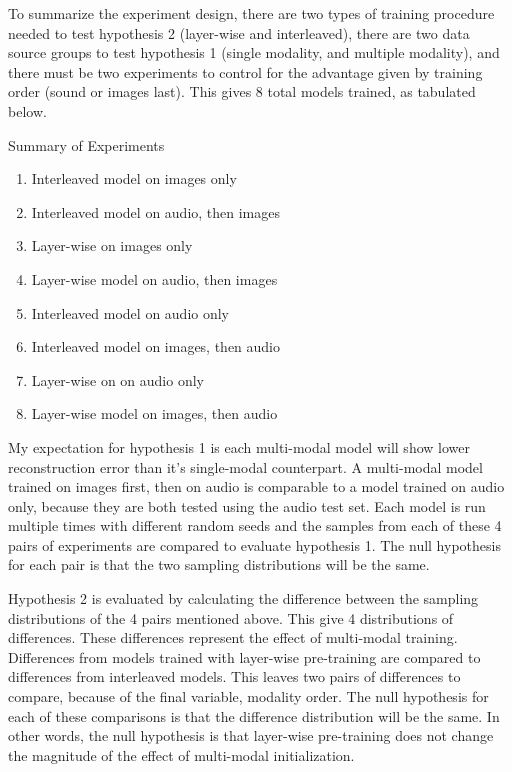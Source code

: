 \documentclass[12pt]{article}
\begin{document}
\begin{doublespacing}
	To summarize the experiment design, there are two types of training procedure needed to test hypothesis 2 (layer-wise and interleaved), there are two data source groups to test hypothesis 1 (single modality, and multiple modality), and there must be two experiments to control for the advantage given by training order (sound or images last). This gives 8 total models trained, as tabulated below.
	
	Summary of Experiments
\begin{enumerate}
\item Interleaved model on images only
\item Interleaved model on audio, then images
\item Layer-wise on images only
\item Layer-wise model on audio, then images
\item Interleaved model on audio only
\item Interleaved model on images, then audio
\item Layer-wise on  on audio only
\item Layer-wise model on images, then audio
\end{enumerate}
	
	My expectation for hypothesis 1 is each multi-modal model will show lower reconstruction error than it's single-modal counterpart. A multi-modal model trained on images first, then on audio is comparable to a model trained on audio only, because they are both tested using the audio test set. Each model is run multiple times with different random seeds and the samples from each of these 4 pairs of experiments are compared to evaluate hypothesis 1. The null hypothesis for each pair is that the two sampling distributions will be the same. 
	
	Hypothesis 2 is evaluated by calculating the difference between the sampling distributions of the 4 pairs mentioned above. This give 4 distributions of differences. These differences represent the effect of multi-modal training. Differences from models trained with layer-wise pre-training are compared to differences from interleaved models. This leaves two pairs of differences to compare, because of the final variable, modality order. The null hypothesis for each of these comparisons is that the difference distribution will be the same. In other words, the null hypothesis is that layer-wise pre-training does not change the magnitude of the effect of multi-modal initialization. 
	

\end{doublespacing}
\end{document}
